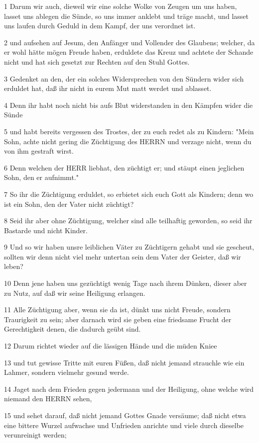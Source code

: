 \par 1 Darum wir auch, dieweil wir eine solche Wolke von Zeugen um uns haben, lasset uns ablegen die Sünde, so uns immer anklebt und träge macht, und lasset uns laufen durch Geduld in dem Kampf, der uns verordnet ist.
\par 2 und aufsehen auf Jesum, den Anfänger und Vollender des Glaubens; welcher, da er wohl hätte mögen Freude haben, erduldete das Kreuz und achtete der Schande nicht und hat sich gesetzt zur Rechten auf den Stuhl Gottes.
\par 3 Gedenket an den, der ein solches Widersprechen von den Sündern wider sich erduldet hat, daß ihr nicht in eurem Mut matt werdet und ablasset.
\par 4 Denn ihr habt noch nicht bis aufs Blut widerstanden in den Kämpfen wider die Sünde
\par 5 und habt bereits vergessen des Trostes, der zu euch redet als zu Kindern: "Mein Sohn, achte nicht gering die Züchtigung des HERRN und verzage nicht, wenn du von ihm gestraft wirst.
\par 6 Denn welchen der HERR liebhat, den züchtigt er; und stäupt einen jeglichen Sohn, den er aufnimmt."
\par 7 So ihr die Züchtigung erduldet, so erbietet sich euch Gott als Kindern; denn wo ist ein Sohn, den der Vater nicht züchtigt?
\par 8 Seid ihr aber ohne Züchtigung, welcher sind alle teilhaftig geworden, so seid ihr Bastarde und nicht Kinder.
\par 9 Und so wir haben unsre leiblichen Väter zu Züchtigern gehabt und sie gescheut, sollten wir denn nicht viel mehr untertan sein dem Vater der Geister, daß wir leben?
\par 10 Denn jene haben uns gezüchtigt wenig Tage nach ihrem Dünken, dieser aber zu Nutz, auf daß wir seine Heiligung erlangen.
\par 11 Alle Züchtigung aber, wenn sie da ist, dünkt uns nicht Freude, sondern Traurigkeit zu sein; aber darnach wird sie geben eine friedsame Frucht der Gerechtigkeit denen, die dadurch geübt sind.
\par 12 Darum richtet wieder auf die lässigen Hände und die müden Kniee
\par 13 und tut gewisse Tritte mit euren Füßen, daß nicht jemand strauchle wie ein Lahmer, sondern vielmehr gesund werde.
\par 14 Jaget nach dem Frieden gegen jedermann und der Heiligung, ohne welche wird niemand den HERRN sehen,
\par 15 und sehet darauf, daß nicht jemand Gottes Gnade versäume; daß nicht etwa eine bittere Wurzel aufwachse und Unfrieden anrichte und viele durch dieselbe verunreinigt werden;
